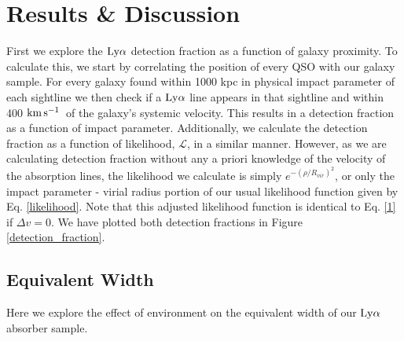 \documentclass[twocolumn,tighten]{aastex62}
\newcommand{\kms}{$\rm km\, s^{-1}$}
\begin{document}
\section{Results \& Discussion}

First we explore the $\rm Ly\alpha$ detection fraction as a function of galaxy proximity. To calculate this, we start by correlating the position of every QSO with our galaxy sample. For every galaxy found within 1000 kpc in physical impact parameter of each sightline we then check if a $\rm Ly\alpha$ line appears in that sightline and within 400 \kms~of the galaxy's systemic velocity. This results in a detection fraction as a function of impact parameter. Additionally, we calculate the detection fraction as a function of likelihood, $\mathcal{L}$, in a similar manner. However, as we are calculating detection fraction without any a priori knowledge of the velocity of the absorption lines, the likelihood we calculate is simply $e^{-(\rho/R_{vir})^2}$, or only the impact parameter - virial radius portion of our usual likelihood function given by Eq. \ref{likelihood}. Note that this adjusted likelihood function is identical to Eq. \ref{1} if $\Delta v = 0$. We have plotted both detection fractions in Figure \ref{detection_fraction}. 




\subsection{Equivalent Width}

Here we explore the effect of environment on the equivalent width of our $\rm Ly\alpha$ absorber sample. 
\end{document}
